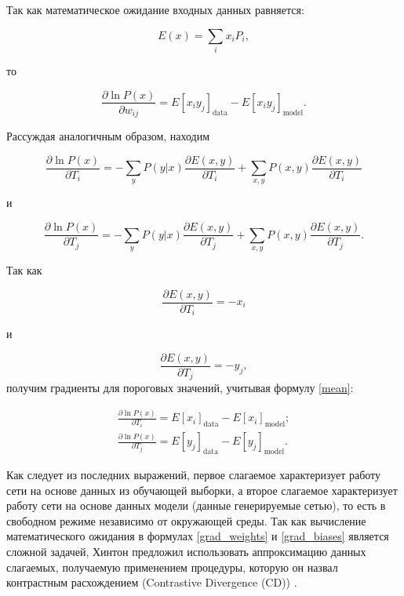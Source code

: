 Так как математическое ожидание входных данных равняется:
	
\begin{equation}
		\label{mean}
		E(x)=\sum_i x_iP_i,
\end{equation}	  
	
то
	
\begin{equation}
    \label{grad_weights}
	\frac{\partial \ln P(x)}{\partial w_{ij}}=E\left[x_iy_j\right]_{\text{data}}-E\left[x_iy_j\right]_{\text{model}}.
\end{equation}
	
Рассуждая аналогичным образом, находим
	
\begin{equation*}
	\frac{\partial \ln P(x)}{\partial T_{i}}=-\sum_y P(y \lvert x)\frac{\partial E(x,y)}{\partial T_{i}} + \sum_{x,y} P(x,y)\frac{\partial E(x,y)}{\partial T_{i}}
\end{equation*}
	
и
	
\begin{equation*}
	\frac{\partial \ln P(x)}{\partial T_{j}}=-\sum_y P(y \lvert x)\frac{\partial E(x,y)}{\partial T_{j}} + \sum_{x,y} P(x,y)\frac{\partial E(x,y)}{\partial T_{j}}.
\end{equation*}
	
Так как
	
\begin{equation*}
	\frac{\partial E(x,y)}{\partial T_{i}}=-x_i 
\end{equation*}
	
и 
	
\begin{equation*}
	\frac{\partial E(x,y)}{\partial T_{j}}=-y_j,
\end{equation*}
получим градиенты для пороговых значений, учитывая формулу \ref{mean}:
	
\begin{equation}
\label{grad_biases}
\begin{aligned}
	\frac{\partial \ln P(x)}{\partial T_i}=E\left[x_i\right]_{\text{data}}-E\left[x_i\right]_{\text{model}};\\
	\frac{\partial \ln P(x)}{\partial T_j}=E\left[y_j\right]_{\text{data}}-E\left[y_j\right]_{\text{model}}.
\end{aligned}
\end{equation}
	
Как следует из последних выражений, первое слагаемое характеризует работу сети на основе данных из обучающей выборки, а  второе слагаемое характеризует работу сети на основе данных модели (данные генерируемые сетью), то есть в свободном режиме независимо от окружающей среды.
Так как вычисление математического ожидания в формулах \ref{grad_weights} и \ref{grad_biases} является сложной задачей, Хинтон предложил использовать аппроксимацию данных слагаемых, получаемую применением процедуры, которую он назвал контрастным расхождением (Contrastive Divergence (CD)) \cite[c.~1533]{n1}.
	
